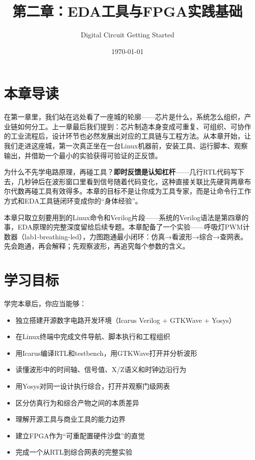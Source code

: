 \documentclass[11pt,a4paper]{article}
\title{第二章：EDA工具与FPGA实践基础}
\author{Digital Circuit Getting Started}
\date{\today}
\begin{document}
\maketitle

\section{本章导读}

在第一章里，我们站在远处看了一座城的轮廓——芯片是什么，系统怎么组织，产业链如何分工。上一章最后我们提到：芯片制造本身变成可重复、可组织、可协作的工业流程后，设计环节也必然发展出对应的工具链与工程方法。从本章开始，让我们走进这座城，第一次真正坐在一台Linux机器前，安装工具、运行脚本、观察输出，并借助一个最小的实验获得可验证的正反馈。

为什么不先学电路原理，再碰工具？\textbf{即时反馈是认知杠杆}——几行RTL代码写下去，几秒钟后在波形窗口里看到信号随着代码变化，这种直接关联比先硬背两章布尔代数再碰工具有效得多。本章的目标不是让你成为工具专家，而是让命令行工作方式和EDA工具链闭环变成你的``身体经验''。

本章只取立刻要用到的Linux命令和Verilog片段——系统的Verilog语法是第四章的事，EDA原理的完整深度留给后续专题。本章配备了一个实验——呼吸灯PWM计数器（lab1-breathing-led），力图跑通最小闭环：仿真→看波形→综合→查网表。先会跑通，再会解释；先观察波形，再追究每个参数的含义。

\section{学习目标}

学完本章后，你应当能够：

\begin{itemize}
  \item 独立搭建开源数字电路开发环境（Icarus Verilog + GTKWave + Yosys）
  \item 在Linux终端中完成文件导航、脚本执行和工程组织
  \item 用Icarus编译RTL和testbench，用GTKWave打开并分析波形
  \item 读懂波形中的时间轴、信号值、X/Z语义和时钟边沿行为
  \item 用Yosys对同一设计执行综合，打开并观察门级网表
  \item 区分仿真行为和综合产物之间的本质差异
  \item 理解开源工具与商业工具的能力边界
  \item 建立FPGA作为``可重配置硬件沙盘''的直觉
  \item 完成一个从RTL到综合网表的完整实验
\end{itemize}
\end{document}
